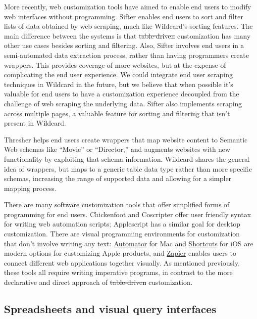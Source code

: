 \documentclass[sigplan,screen,10pt,anonymous,review]{acmart}
\providecommand{\DIFadd}[1]{{\protect\color{blue}\uwave{#1}}} %
\providecommand{\DIFdel}[1]{{\protect\color{red}\sout{#1}}}                      %
\providecommand{\DIFaddbegin}{} %
\providecommand{\DIFaddend}{} %
\providecommand{\DIFdelbegin}{} %
\providecommand{\DIFdelend}{} %
\begin{document}
More recently, web customization tools have aimed to enable end users to
modify web interfaces without programming. Sifter \citep{huynh2006}
enables end users to sort and filter lists of data obtained by web
scraping, much like Wildcard's sorting features. The main difference
between the systems is that \DIFdelbegin \DIFdel{table-driven }\DIFdelend \DIFaddbegin \DIFadd{data-driven }\DIFaddend customization has many other use
cases besides sorting and filtering. Also, Sifter involves end users in
a semi-automated data extraction process, rather than having programmers
create wrappers. This provides coverage of more websites, but at the
expense of complicating the end user experience. We could integrate end
user scraping techniques in Wildcard in the future, but we believe that
when possible it's valuable for end users to have a customization
experience decoupled from the challenge of web scraping the underlying
data. Sifter also implements scraping across multiple pages, a valuable
feature for sorting and filtering that isn't present in Wildcard.

Thresher \citep{hogue2005} helps end users create wrappers that map
website content to Semantic Web schemas like ``Movie'' or ``Director,''
and augments websites with new functionality by exploiting that schema
information. Wildcard shares the general idea of wrappers, but maps to a
generic table data type rather than more specific schemas, increasing
the range of supported data and allowing for a simpler mapping process.

There are many software customization tools that offer simplified forms
of programming for end users. Chickenfoot \citep{bolin2005} and
Coscripter \citep{leshed2008} offer user friendly syntax for writing web
automation scripts; Applescript \citep{cook2007} has a similar goal for
desktop customization. There are visual programming environments for
customization that don't involve writing any text:
\href{https://support.apple.com/guide/automator/welcome/mac}{Automator}
for Mac and
\href{https://apps.apple.com/us/app/shortcuts/id915249334}{Shortcuts}
for iOS are modern options for customizing Apple products, and
\href{https://zapier.com/}{Zapier} enables users to connect different
web applications together visually. As mentioned previously, these tools
all require writing imperative programs, in contrast to the more
declarative and direct approach of \DIFdelbegin \DIFdel{table-driven }\DIFdelend \DIFaddbegin \DIFadd{data-driven }\DIFaddend customization.

\hypertarget{spreadsheets-and-visual-query-interfaces}{%
\subsection{Spreadsheets and visual query
interfaces}\label{spreadsheets-and-visual-query-interfaces}}
\end{document}
